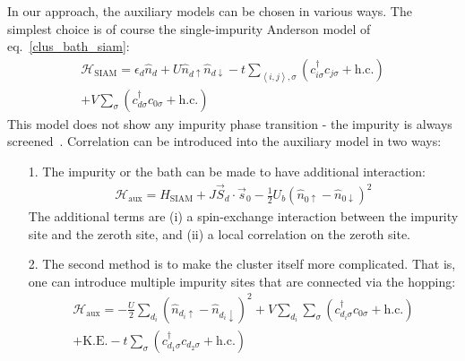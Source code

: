 \documentclass[reprint,hidelinks]{revtex4-2}
\begin{document}
In our approach, the auxiliary models can be chosen in various ways. The simplest choice is of course the single-impurity Anderson model of eq.~\ref{clus_bath_siam}:
\begin{equation}\begin{aligned}
\mathcal{H}_\text{SIAM} = \epsilon_d \hat n_d + U \hat n_{d \uparrow} \hat n_{d \downarrow} - t\sum_{\left<i,j \right>, \sigma}\left(c^\dagger_{i\sigma}c_{j\sigma} + \text{h.c.}\right) \\
+ V\sum_\sigma \left( c^\dagger_{d\sigma}c_{0\sigma} + \text{h.c.}\right) 
\end{aligned}\end{equation}
This model does not show any impurity phase transition - the impurity is always screened~\cite{hrk_wilson_1980,wilson1975,bullaNRGreview}. Correlation can be introduced into the auxiliary model in two ways:
\begin{itemize}
	\item[1.] The impurity or the bath can be made to have additional interaction: 
\begin{gather}
\mathcal{H}_\text{aux} = H_\text{SIAM} + J \vec{S}_d\cdot\vec{s}_0 - \frac{1}{2}U_b \left(\hat n_{0 \uparrow} - \hat n_{0 \downarrow}\right)^2
\end{gather}
The additional terms are (i) a spin-exchange interaction between the impurity site and the zeroth site, and (ii) a local correlation on the zeroth site.
\item[2.] The second method is to make the cluster itself more complicated. That is, one can introduce multiple impurity sites that are connected via the hopping:
	\begin{equation}\begin{aligned}
	\mathcal{H}_\text{aux} = -\frac{U}{2}\sum_{d_i}\left(\hat n_{d_i \uparrow} - \hat n_{d_i \downarrow}\right) ^2 + V\sum_{d_i}\sum_\sigma\left( c^\dagger_{d_i\sigma}c_{0\sigma} + \text{h.c.} \right) \\
	+ \text{K.E.} - t\sum_{\sigma}\left(c^\dagger_{d_1\sigma}c_{d_2\sigma} + \text{h.c.}\right)
	\end{aligned}\end{equation}
	
\end{itemize}
\end{document}
